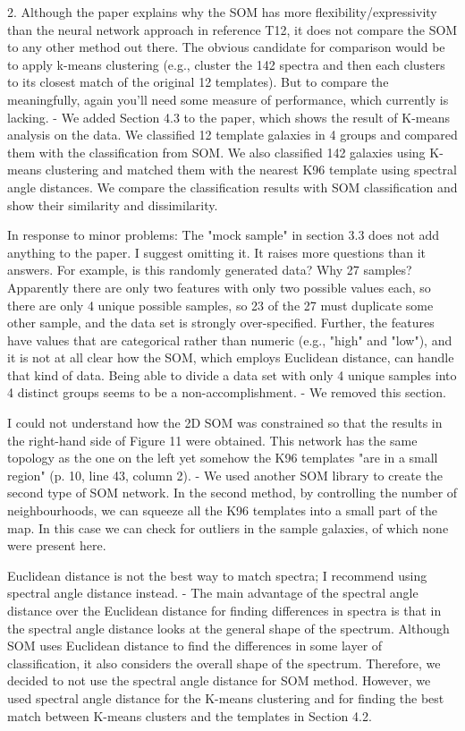 2. Although the paper explains why the SOM has more flexibility/expressivity than the neural network approach in reference T12, it does not compare the SOM to any other method out there.  The obvious candidate for comparison would be to apply k-means clustering (e.g., cluster the 142 spectra and then each clusters to its closest match of the original 12 templates).  But to compare the meaningfully, again you'll need some measure of performance, which currently is lacking.
    - We added Section 4.3 to the paper, which shows the result of K-means analysis on the data. 
    We classified 12 template galaxies in 4 groups and compared them with the classification from SOM. We also classified 142 galaxies using K-means clustering and matched them with the nearest K96 template using spectral angle distances. We compare the classification results with SOM classification and show their similarity and dissimilarity.

In response to minor problems:
The "mock sample" in section 3.3 does not add anything to the paper.  I suggest omitting it.  It raises more questions than it answers.  For example, is this randomly generated data?  Why 27 samples? Apparently there are only two features with only two possible values each, so there are only 4 unique possible samples, so 23 of the 27 must duplicate some other sample, and the data set is strongly over-specified.  Further, the features have values that are categorical rather than numeric (e.g., "high" and "low"), and it is not at all clear how the SOM, which employs Euclidean distance, can handle that kind of data.  Being able to divide a data set with only 4 unique samples into 4 distinct groups seems to be a non-accomplishment.
    - We removed this section. 
    
    
I could not understand how the 2D SOM was constrained so that the results in the right-hand side of Figure 11 were obtained.  This network has the same topology as the one on the left yet somehow the K96 templates "are in a small region" (p. 10, line 43, column 2).
    - We used another SOM library to create the second type of SOM network. In the second method, by controlling the number of neighbourhoods, we can squeeze all the K96 templates into a small part of the map. In this case we can check for outliers in the sample galaxies, of which none were present here.

Euclidean distance is not the best way to match spectra; I recommend using spectral angle distance instead.
    - The main advantage of the spectral angle distance over the Euclidean distance for finding differences in spectra is that in the spectral angle distance looks at the general shape of the spectrum. Although SOM uses Euclidean distance to find the differences in some layer of classification, it also considers the overall shape of the spectrum. 
    Therefore, we decided to not use the spectral angle distance for SOM method.
    However, we used spectral angle distance for the K-means clustering and for finding the best match between K-means clusters and the templates in Section 4.2. 

